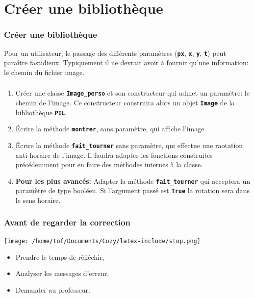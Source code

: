 \documentclass[svgnames,11pt]{beamer}
\begin{document}
\section{Créer une bibliothèque}
\begin{frame}
    \frametitle{Créer une bibliothèque}

Pour un utilisateur, le passage des différents paramètres (\textbf{\texttt{px}}, \textbf{\texttt{x}}, \textbf{\texttt{y}}, \textbf{\texttt{t}}) peut paraître fastidieux. Typiquement il ne devrait avoir à fournir qu'une information: le chemin du fichier image.

\end{frame}
\begin{frame}
    \frametitle{}

    \begin{activite}
    \begin{enumerate}
        \item Créer une classe \textbf{\texttt{Image\_perso}} et son constructeur qui admet un paramètre: le chemin de l'image. Ce constructeur construira alors un objet \textbf{\texttt{Image}} de la bibliothèque \textbf{\texttt{PIL}}.
        \item Écrire la méthode \textbf{\texttt{montrer}}, sans paramètre, qui affiche l'image.
        \item Écrire la méthode \textbf{\texttt{fait\_tourner}} sans paramètre, qui effectue une raotation anti-horaire de l'image. Il faudra adapter les fonctions construites précédemment pour en faire des méthodes internes à la classe.
        \item \textbf{Pour les plus avancés:} Adapter la méthode \textbf{\texttt{fait\_tourner}} qui acceptera un paramètre de type booléen. Si l'argument passé est \textbf{\texttt{True}} la rotation sera dans le sens horaire.
    \end{enumerate}
    \end{activite}

\end{frame}
\begin{frame}
    \frametitle{Avant de regarder la correction}
\begin{center}
    \centering
    \texttt{[image: /home/tof/Documents/Cozy/latex-include/stop.png]}
    \end{center}
{\Large
    \begin{itemize}
        \item Prendre le temps de réfléchir,
        \item Analyser les messages d'erreur,
        \item Demander au professeur.
    \end{itemize}
}
\end{frame}
\end{document}
